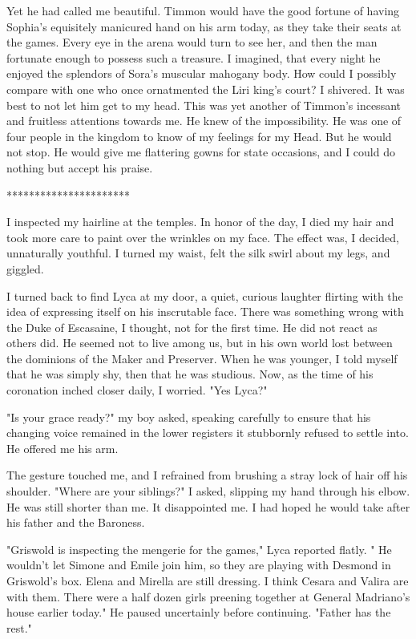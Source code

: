 \documentclass{article}
\begin{document}
Yet he had called me beautiful. Timmon would have the good fortune of having Sophia's equisitely manicured hand on his arm today, as they take their seats at the games. Every eye in the arena would turn to see her, and then the man fortunate enough to possess such a treasure. I imagined, that every night he enjoyed the splendors of Sora's muscular mahogany body. How could I possibly compare with one who once ornatmented the Liri king's court? I shivered. It was best to not let him get to my head. This was yet another of Timmon's incessant and fruitless attentions towards me. He knew of the impossibility. He was one of four people in the kingdom to know of my feelings for my Head. But he would not stop. He would give me flattering gowns for state occasions, and I could do nothing but accept his praise.

**********************

I inspected my hairline at the temples. In honor of the day, I died my hair and took more care to paint over the wrinkles on my face. The effect was, I decided, unnaturally youthful. I turned my waist, felt the silk swirl about my legs, and giggled.

I turned back to find Lyca at my door, a quiet, curious laughter flirting with the idea of expressing itself on his inscrutable face. There was something wrong with the Duke of Escasaine, I thought, not for the first time. He did not react as others did. He seemed not to live among us, but in his own world lost between the dominions of the Maker and Preserver. When he was younger, I told myself that he was simply shy, then that he was studious. Now, as the time of his coronation inched closer daily, I worried. "Yes Lyca?"

"Is your grace ready?" my boy asked, speaking carefully to ensure that his changing voice remained in the lower registers it stubbornly refused to settle into. He offered me his arm.

The gesture touched me, and I refrained from brushing a stray lock of hair off his shoulder. "Where are your siblings?" I asked, slipping my hand through his elbow. He was still shorter than me. It disappointed me. I had hoped he would take after his father and the Baroness.

"Griswold is inspecting the mengerie for the games," Lyca reported flatly. " He wouldn't let Simone and Emile join him, so they are playing with Desmond in Griswold's box. Elena and Mirella are still dressing. I think Cesara and Valira are with them. There were a half dozen girls preening together at General Madriano's house earlier today." He paused uncertainly before continuing. "Father has the rest."
\end{document}
